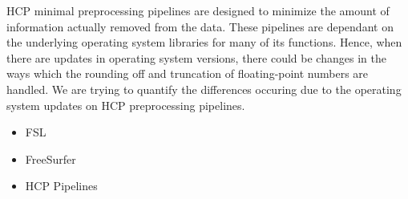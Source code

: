 HCP minimal preprocessing pipelines are designed to minimize the amount of information actually removed from the data. These pipelines are dependant on the underlying operating system libraries for many of its functions. Hence, when there are updates in operating system versions, there could be changes in the ways which the rounding off and truncation of floating-point numbers are handled. We are trying to quantify the differences occuring due to the operating system updates on HCP preprocessing pipelines.

\begin{itemize}
 \item FSL
 \item FreeSurfer
 \item HCP Pipelines
\end{itemize}


